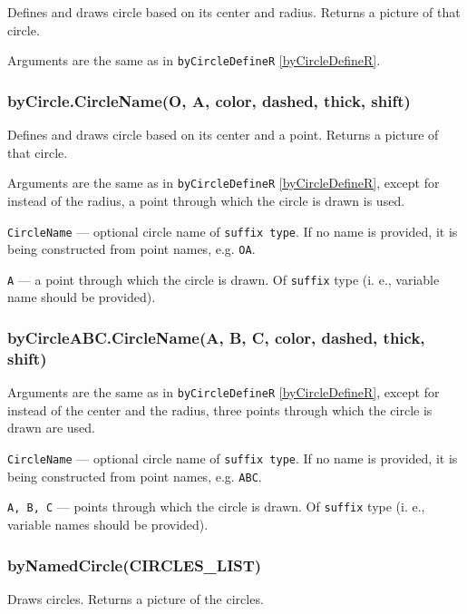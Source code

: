 \documentclass{ltxdoc}
\begin{document}
	Defines and draws circle based on its center and radius. Returns a picture of that circle.
	
	Arguments are the same as in \texttt{byCircleDefineR} \ref{byCircleDefineR}.

\subsubsection{byCircle.CircleName(O, A, color, dashed, thick, shift)}\label{byCircle}
	
	Defines and draws circle based on its center and a point. Returns a picture of that circle.
	
	Arguments are the same as in \texttt{byCircleDefineR} \ref{byCircleDefineR}, except for instead of the radius, a point through which the circle is drawn is used.
	
	\texttt{CircleName} — optional circle name of \texttt{suffix type}. If no name is provided, it is being constructed from point names, e.g. \texttt{OA}.
	
	\texttt{A} — a point through which the circle is drawn. Of \texttt{suffix} type (i. e., variable name should be provided).

\subsubsection{byCircleABC.CircleName(A, B, C, color, dashed, thick, shift)}\label{byCircleABC}
	
	Arguments are the same as in \texttt{byCircleDefineR} \ref{byCircleDefineR}, except for instead of the center and the radius, three points through which the circle is drawn are used.
	
	\texttt{CircleName} — optional circle name of \texttt{suffix type}. If no name is provided, it is being constructed from point names, e.g. \texttt{ABC}.
	
	\texttt{A, B, C} — points through which the circle is drawn. Of \texttt{suffix} type (i. e., variable names should be provided).


\subsubsection{byNamedCircle(CIRCLES\_LIST)}\label{byNamedCircle}
	
	Draws circles. Returns a picture of the circles.
	
\end{document}
